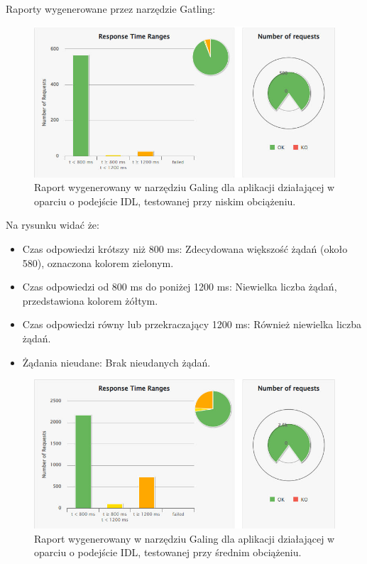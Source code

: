 \documentclass[runningheads,12pt]{llncs}
\begin{document}
Raporty wygenerowane przez narzędzie Gatling: 

\begin{figure}
    \includegraphics[width=\linewidth]{images/idl-low-gatling-graph.jpg}
    \caption{Raport wygenerowany w narzędziu Galing dla aplikacji działającej w oparciu o podejście IDL, testowanej przy niskim obciążeniu.} \label{fig1}
\end{figure}

Na rysunku widać że:

\begin{itemize}
    \item Czas odpowiedzi krótszy niż 800 ms: Zdecydowana większość żądań (około 580), oznaczona kolorem zielonym.
    \item Czas odpowiedzi od 800 ms do poniżej 1200 ms: Niewielka liczba żądań, przedstawiona kolorem żółtym.
    \item Czas odpowiedzi równy lub przekraczający 1200 ms: Również niewielka liczba żądań.
    \item Żądania nieudane: Brak nieudanych żądań.
\end{itemize}

\newpage

\begin{figure}
    \includegraphics[width=\linewidth]{images/idl-midle-gatling-graph.jpg}
    \caption{Raport wygenerowany w narzędziu Galing dla aplikacji działającej w oparciu o podejście IDL, testowanej przy średnim obciążeniu.} \label{fig1}
\end{figure}
\end{document}
